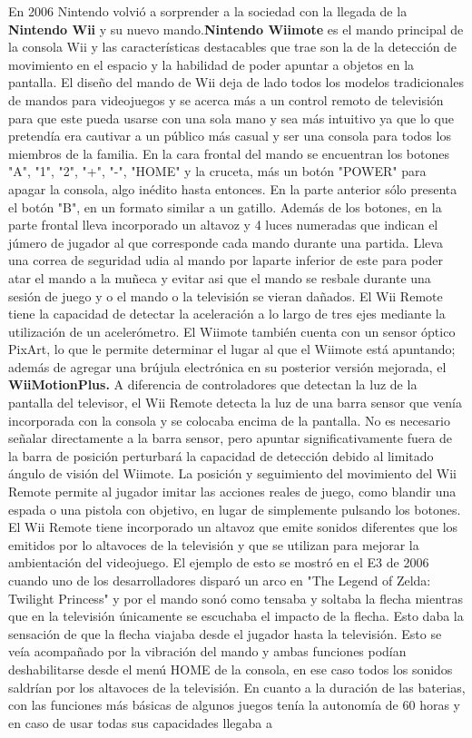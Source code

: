 En 2006 Nintendo  volvi\'o a sorprender a la sociedad con la llegada de la \textbf{Nintendo Wii} y su nuevo mando.\textbf{Nintendo Wiimote} es el mando principal de la consola Wii y las caracter\'isticas destacables que trae son la de la detecci\'on de movimiento en el espacio y la habilidad de poder apuntar a objetos en la pantalla. El dise\~no del mando de Wii deja de lado todos los modelos tradicionales de mandos para videojuegos y se acerca m\'as a un control remoto de televisi\'on para que este pueda usarse con una sola mano y sea m\'as intuitivo ya que lo que pretend\'ia era cautivar a un p\'ublico m\'as casual y ser una consola para todos los miembros de la familia. En la cara frontal del mando se encuentran los botones "A", "1", "2", "+", "-", "HOME" y la cruceta, m\'as un bot\'on "POWER" para apagar la consola, algo in\'edito hasta entonces. En la parte anterior s\'olo presenta el bot\'on "B", en un formato similar a un gatillo. Adem\'as de los botones, en la parte frontal lleva incorporado un altavoz y 4 luces numeradas que indican el j\'umero de jugador al que corresponde cada mando durante una partida. Lleva una correa de seguridad udia al mando por laparte inferior de este para poder atar el mando a la mu\~neca y evitar asi que el mando se resbale durante una sesi\'on de juego y o el mando o la televisi\'on se vieran da\~nados. El Wii Remote tiene la capacidad de detectar la aceleraci\'on a lo largo de tres ejes mediante la utilizaci\'on de un aceler\'ometro. El Wiimote tambi\'en cuenta con un sensor \'optico PixArt, lo que le permite determinar el lugar al que el Wiimote est\'a apuntando; adem\'as de agregar una br\'ujula electr\'onica en su posterior versi\'on mejorada, el \textbf{WiiMotionPlus.} A diferencia de controladores que detectan la luz de la pantalla del televisor, el Wii Remote detecta la luz de una barra sensor que ven\'ia incorporada con la consola y se colocaba encima de la pantalla. No es necesario se\~nalar directamente a la barra sensor, pero apuntar significativamente fuera de la barra de posici\'on perturbar\'a la capacidad de detecci\'on debido al limitado \'angulo de visi\'on del Wiimote. La posici\'on y seguimiento del movimiento del Wii Remote permite al jugador imitar las acciones reales de juego, como blandir una espada o una pistola con objetivo, en lugar de simplemente pulsando los botones. El Wii Remote tiene incorporado un altavoz que emite sonidos diferentes que los emitidos por lo altavoces de la televisi\'on y que se utilizan para mejorar la ambientaci\'on del videojuego. El ejemplo de esto se mostr\'o en el E3 de 2006 cuando uno de los desarrolladores dispar\'o un arco en "The Legend of Zelda: Twilight Princess" y por el mando son\'o como tensaba y soltaba la flecha mientras que en la televisi\'on \'unicamente se escuchaba el impacto de la flecha. Esto daba la sensaci\'on de que la flecha viajaba desde el jugador hasta la televisi\'on. Esto se ve\'ia acompa\~nado por la vibraci\'on del mando y ambas funciones pod\'ian deshabilitarse desde el men\'u HOME de la consola, en ese caso todos los sonidos saldr\'ian por los altavoces de la televisi\'on. En cuanto a la duraci\'on de las baterias, con las funciones m\'as b\'asicas de algunos juegos ten\'ia la autonom\'ia de 60 horas y en caso de usar todas sus capacidades llegaba a 